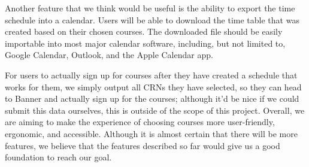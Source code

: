 \documentclass[12pt]{article}
\begin{document}
Another feature that we think would be useful is the ability to export the time schedule into a calendar. Users will be able to download the time table that was created based on their chosen courses. The downloaded file should be easily importable into most major calendar software, including, but not limited to, Google Calendar, Outlook, and the Apple Calendar app. \par
For users to actually sign up for courses after they have created a schedule that works for them, we simply output all CRNs they have selected, so they can head to Banner and actually sign up for the courses; although it'd be nice if we could submit this data ourselves, this is outside of the scope of this project.
Overall, we are aiming to make the experience of choosing courses more user-friendly, ergonomic, and accessible. Although it is almost certain that there will be more features, we believe that the features described so far would give us a good foundation to reach our goal.
\end{document}

